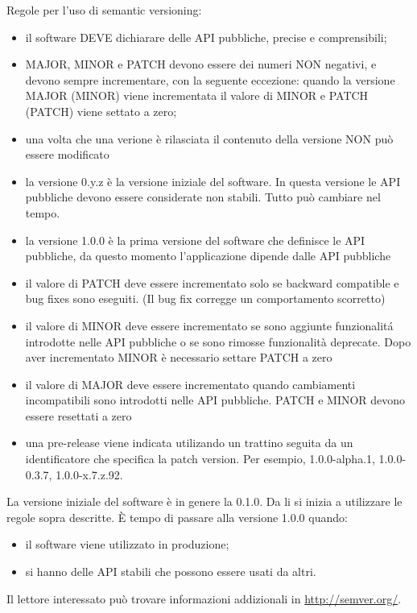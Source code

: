 \documentclass{article}
\theoremstyle{definition}
\begin{document}
Regole per l'uso di semantic versioning:
\begin{itemize}
\item il software DEVE dichiarare delle API pubbliche, precise e comprensibili;
\item MAJOR, MINOR e PATCH devono essere dei numeri NON negativi, e devono sempre incrementare, con la seguente eccezione: quando la versione MAJOR (MINOR) viene incrementata il valore di MINOR e PATCH (PATCH) viene settato a zero;
\item una volta che una verione \`e rilasciata il contenuto della versione NON pu\`o essere modificato
\item la versione 0.y.z \`e la versione iniziale del software. In questa versione le API pubbliche devono essere considerate non stabili. Tutto pu\`o cambiare nel tempo.
\item la versione 1.0.0 \`e la prima versione del software che definisce le API pubbliche, da questo momento l'applicazione dipende dalle API pubbliche
\item il valore di PATCH deve essere incrementato solo se backward compatible e bug fixes sono eseguiti. (Il bug fix corregge un comportamento scorretto)
\item il valore di MINOR deve essere incrementato se sono aggiunte funzionalit\'a introdotte nelle API pubbliche o se sono rimosse funzionalit\`a deprecate. Dopo aver incrementato MINOR \`e necessario settare PATCH a zero
\item il valore di MAJOR deve essere incrementato quando cambiamenti incompatibili sono introdotti nelle API pubbliche. PATCH e MINOR devono essere resettati a zero
\item una pre-release viene indicata utilizando un trattino seguita da un identificatore che specifica la patch version. Per esempio, 1.0.0-alpha.1, 1.0.0-0.3.7, 1.0.0-x.7.z.92. 
\end{itemize}

La versione iniziale del software \`e in genere la 0.1.0. Da li si inizia a utilizzare le regole sopra descritte.
\`E tempo di passare alla versione 1.0.0 quando:
\begin{itemize}
\item il software viene utilizzato in produzione;
\item si hanno delle API stabili che possono essere usati da altri.
\end{itemize}


Il lettore interessato pu\`o trovare informazioni addizionali in \url{http://semver.org/}.
\end{document}
